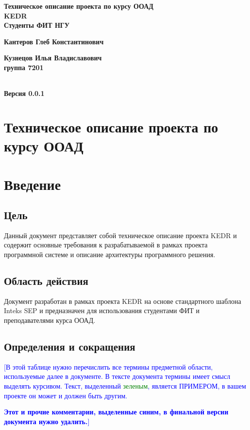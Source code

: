 \documentclass[pdftex,12pt,a4paper]{report}
\providecommand{\comment}[1]{\textcolor{blue}{#1}}
\providecommand{\replace}[1]{\textcolor{green}{#1}}
\begin{document}
\begin{titlepage}
\begin{flushright}
	{\huge
	\textbf{Техническое описание проекта по курсу ООАД}
\\[1cm]
	\textbf{KEDR}
\\[1cm]
	\textbf{Студенты ФИТ НГУ}

	\textbf{Кантеров Глеб Константинович}

	\textbf{Кузнецов Илья Владиславович}
\\[1cm]
	\textbf{группа 7201}
	}
\\[1cm]
	{\large \textbf{Версия 0.0.1}}
\end{flushright}
\end{titlepage}

\tableofcontents
\newpage

\section*{Техническое описание проекта по курсу ООАД}
\section{Введение}
\subsection{Цель}
Данный документ представляет собой техническое описание проекта KEDR и содержит основные требования к разрабатываемой в рамках проекта программной системе и описание архитектуры программного решения.

\subsection{Область действия}
Документ разработан в рамках проекта KEDR на основе стандартного шаблона Inteks SEP и предназначен для использования студентами ФИТ и преподавателями курса ООАД.

\subsection{Определения и сокращения}
\comment{[В этой таблице нужно перечислить все термины предметной области, используемые далее в документе. В тексте документа термины имеет смысл выделять курсивом. Текст, выделенный \replace{зеленым}, является ПРИМЕРОМ, в вашем проекте он может и должен быть другим.}

\comment{\textbf{Этот и прочие комментарии, выделенные синим, в финальной версии документа нужно удалить.}]}
\end{document}
